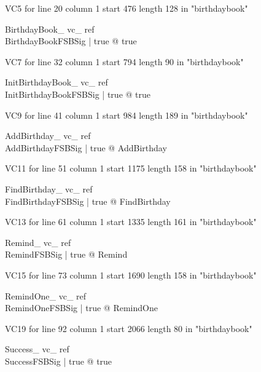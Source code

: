 \documentclass{article}
\begin{document}
VC5 for line 20 column 1 start 476 length 128 in "birthdaybook"
\begin{theorem}{ BirthdayBook\_ vc\_ ref}\\
 \exists BirthdayBookFSBSig | true @ true \\

\end{theorem}

VC7 for line 32 column 1 start 794 length 90 in "birthdaybook"
\begin{theorem}{ InitBirthdayBook\_ vc\_ ref}\\
 \exists InitBirthdayBookFSBSig | true @ true \\

\end{theorem}

VC9 for line 41 column 1 start 984 length 189 in "birthdaybook"
\begin{theorem}{ AddBirthday\_ vc\_ ref}\\
 \forall AddBirthdayFSBSig | true @ \pre AddBirthday \\

\end{theorem}

VC11 for line 51 column 1 start 1175 length 158 in "birthdaybook"
\begin{theorem}{ FindBirthday\_ vc\_ ref}\\
 \forall FindBirthdayFSBSig | true @ \pre FindBirthday \\

\end{theorem}

VC13 for line 61 column 1 start 1335 length 161 in "birthdaybook"
\begin{theorem}{ Remind\_ vc\_ ref}\\
 \forall RemindFSBSig | true @ \pre Remind \\

\end{theorem}

VC15 for line 73 column 1 start 1690 length 158 in "birthdaybook"
\begin{theorem}{ RemindOne\_ vc\_ ref}\\
 \forall RemindOneFSBSig | true @ \pre RemindOne \\

\end{theorem}

VC19 for line 92 column 1 start 2066 length 80 in "birthdaybook"
\begin{theorem}{ Success\_ vc\_ ref}\\
 \exists SuccessFSBSig | true @ true \\

\end{theorem}
\end{document}
